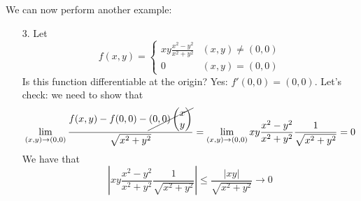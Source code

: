 \documentclass{article}
\begin{document}
We can now perform another example:
\begin{itemize}

  \item [3.] Let
  \[f(x, y) = \left\{\begin{array}{cc}
    xy\frac{x^2 - y^2}{x^2 + y^2} & (x, y) \neq (0, 0) \\
    0 & (x, y) = (0, 0)
  \end{array}\right.\]
  Is this function differentiable at the origin? Yes: \(f'(0, 0) = (0, 0)\). Let's check: we need to show that
  \[\lim_{(x, y) \to (0, 0)}\frac{f(x, y) - f(0, 0) - \cancel{(0, 0)\begin{pmatrix} x \\ y \end{pmatrix}}}{\sqrt{x^2 + y^2}} = \lim_{(x, y) \to (0, 0)}xy\frac{x^2 - y^2}{x^2 + y^2}\frac{1}{\sqrt{x^2 + y^2}} = 0\]
  We have that
  \[\left|xy\frac{x^2 - y^2}{x^2 + y^2}\frac{1}{\sqrt{x^2 + y^2}}\right| \leq \frac{|xy|}{\sqrt{x^2 + y^2}} \to 0\]

\end{itemize}
\end{document}
